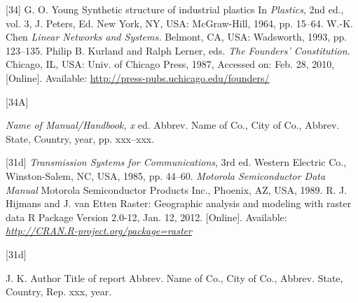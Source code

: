 \documentclass[correspondence]{IEEEtaes}
\begin{document}
\vspace*{-12pt}
\begin{thebibliography}{[34]}
\setcounter{enumiv}{6}
G. O. Young
\newblock Synthetic structure of industrial plastics
\newblock In \emph{Plastics}, 2nd ed., vol. 3, J. Peters, Ed. New York, NY, USA: McGraw-Hill, 1964, pp. 15--64.
W.-K. Chen
\newblock \emph{Linear Networks and Systems.} Belmont, CA, USA: Wadsworth, 1993, pp. 123--135.
Philip B. Kurland and Ralph Lerner, eds.
\newblock \emph{The Founders' Constitution.} Chicago, IL, USA: Univ. of Chicago Press, 1987, Accessed on: Feb. 28, 2010, {[}Online{]}. Available: \href{http://press-pubs.uchicago.edu/founders/}{http://press-pubs.uchicago.edu/founders/}
\end{thebibliography}

\vspace*{-12pt}
\begin{thebibliography}{[34A]}
\item[]  \emph{Name of Manual/Handbook, x} ed.
\newblock Abbrev. Name of Co., City of Co., Abbrev. State, Country, year, pp. xxx--xxx.
\end{thebibliography}

\vspace*{-12pt}
\begin{thebibliography}{[31d]}
\setcounter{enumiv}{9}
\emph{Transmission Systems for Communications}, 3rd ed.
\newblock Western Electric Co., Winston-Salem, NC, USA, 1985, pp. 44--60.
\emph{Motorola Semiconductor Data Manual}
\newblock Motorola Semiconductor Products Inc., Phoenix, AZ, USA, 1989.
R. J. Hijmans and J. van Etten
\newblock Raster: Geographic analysis and modeling with raster data
\newblock R Package Version 2.0-12, Jan. 12, 2012. {[}Online{]}. Available: \emph{\href{http://CRAN.R-project.org/package=raster}{http://CRAN.R-project.org/package=raster}}
\end{thebibliography}

\vspace*{-12pt}

\begin{thebibliography}{[31d]}
\item[]  J. K. Author
\newblock Title of report
\newblock Abbrev. Name of Co., City of Co., Abbrev. State, Country, Rep. xxx, year.
\end{thebibliography}
\end{document}

